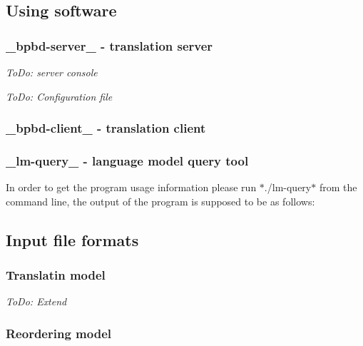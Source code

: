 \subsection*{Using software}

\subsubsection*{\+\_\+bpbd-\/server\+\_\+ -\/ translation server}

{\itshape To\+Do\+: server console}

{\itshape To\+Do\+: Configuration file} \subsubsection*{\+\_\+bpbd-\/client\+\_\+ -\/ translation client}

\subsubsection*{\+\_\+lm-\/query\+\_\+ -\/ language model query tool}

In order to get the program usage information please run $\ast$./lm-\/query$\ast$ from the command line, the output of the program is supposed to be as follows\+:




\subsection*{Input file formats}

\subsubsection*{Translatin model}

{\itshape To\+Do\+: Extend}

\subsubsection*{Reordering model}

